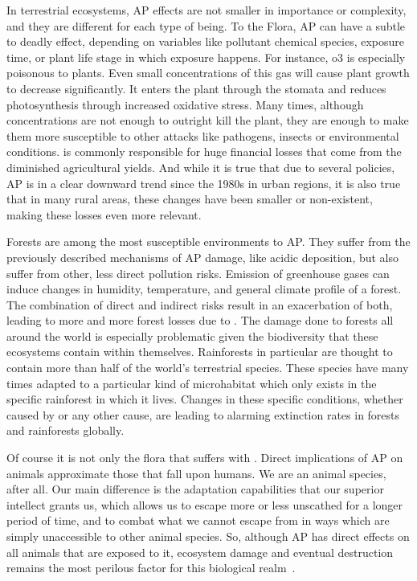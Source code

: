 In terrestrial ecosystems, \gls{AP} effects are not smaller in
importance or complexity, and they are different for each type of being.
To the Flora, \gls{AP} can have a subtle to deadly effect, depending on
variables like pollutant chemical species, exposure time, or plant life
stage in which exposure happens. For instance, \gls{o3} is especially
poisonous to plants. Even small concentrations of this gas will cause
plant growth to decrease significantly. It enters the plant through the
stomata and reduces photosynthesis through increased oxidative stress.
Many times, although concentrations are not enough to outright kill the
plant, they are enough to make them more susceptible to other attacks
like pathogens, insects or environmental conditions.  is
commonly responsible for huge financial losses that come from the
diminished agricultural yields. And while it is true that due to several
policies, \gls{AP} is in a clear downward trend since the 1980s in urban
regions, it is also true that in many rural areas, these changes have
been smaller or non-existent, making these losses even more relevant.

Forests are among the most susceptible environments to \gls{AP}. They
suffer from the previously described mechanisms of \gls{AP} damage, like
acidic deposition, but also suffer from other, less direct pollution
risks. Emission of greenhouse gases can induce changes in humidity,
temperature, and general climate profile of a forest. The combination of
direct and indirect risks result in an exacerbation of both, leading to
more and more forest losses due to . The damage done to
forests all around the world is especially problematic given the
biodiversity that these ecosystems contain within themselves.
Rainforests in particular are thought to contain more than half of the
world's terrestrial species. These species have many times adapted to a
particular kind of microhabitat which only exists in the specific
rainforest in which it lives. Changes in these specific conditions,
whether caused by  or any other cause, are leading to
alarming extinction rates in forests and rainforests globally.

Of course it is not only the flora that suffers with .
Direct implications of \gls{AP} on animals approximate those that fall
upon humans. We are an animal species, after all. Our main difference is
the adaptation capabilities that our superior intellect grants us, which
allows us to escape more or less unscathed for a longer period of time,
and to combat what we cannot escape from in ways which are simply
unaccessible to other animal species. So, although \gls{AP} has direct
effects on all animals that are exposed to it, ecosystem damage and
eventual destruction remains the most perilous factor for this
biological realm~.





